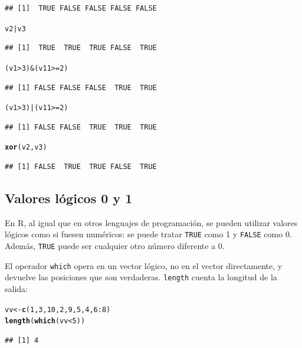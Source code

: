 \documentclass{config/apuntes}\usepackage[]{graphicx}\usepackage[]{xcolor}
\makeatletter
\newcommand{\hlnum}[1]{\textcolor[rgb]{0.686,0.059,0.569}{#1}}%
\newcommand{\hlopt}[1]{\textcolor[rgb]{0,0,0}{#1}}%
\newcommand{\hldef}[1]{\textcolor[rgb]{0.345,0.345,0.345}{#1}}%
\newcommand{\hlkwb}[1]{\textcolor[rgb]{0.69,0.353,0.396}{#1}}%
\newcommand{\hlkwd}[1]{\textcolor[rgb]{0.737,0.353,0.396}{\textbf{#1}}}%
\newenvironment{kframe}{%
 \def\at@end@of@kframe{}%
 \ifinner\ifhmode%
  \def\at@end@of@kframe{\end{minipage}}%
  \begin{minipage}{\columnwidth}%
 \fi\fi%
 \def\FrameCommand##1{\hskip\@totalleftmargin \hskip-\fboxsep
 \colorbox{shadecolor}{##1}\hskip-\fboxsep
     \hskip-\linewidth \hskip-\@totalleftmargin \hskip\columnwidth}%
 \MakeFramed {\advance\hsize-\width
   \@totalleftmargin\z@ \linewidth\hsize
   \@setminipage}}%
 {\par\unskip\endMakeFramed%
 \at@end@of@kframe}
\newenvironment{knitrout}{}{} %
\newcommand{\code}[1]{\texttt{#1}}
\makeatother
\begin{document}
\begin{knitrout}
\begin{kframe}
\begin{alltt}
\end{alltt}
\begin{verbatim}
## [1]  TRUE FALSE FALSE FALSE FALSE
\end{verbatim}
\begin{alltt}
\hldef{v2} \hlopt{|} \hldef{v3}
\end{alltt}
\begin{verbatim}
## [1]  TRUE  TRUE  TRUE FALSE  TRUE
\end{verbatim}
\begin{alltt}
\hldef{(v1} \hlopt{>} \hlnum{3}\hldef{)} \hlopt{&} \hldef{(v11} \hlopt{>=} \hlnum{2}\hldef{)}
\end{alltt}
\begin{verbatim}
## [1] FALSE FALSE FALSE  TRUE  TRUE
\end{verbatim}
\begin{alltt}
\hldef{(v1} \hlopt{>} \hlnum{3}\hldef{)} \hlopt{|} \hldef{(v11} \hlopt{>=} \hlnum{2}\hldef{)}
\end{alltt}
\begin{verbatim}
## [1] FALSE FALSE  TRUE  TRUE  TRUE
\end{verbatim}
\begin{alltt}
\hlkwd{xor}\hldef{(v2, v3)}
\end{alltt}
\begin{verbatim}
## [1] FALSE  TRUE  TRUE FALSE  TRUE
\end{verbatim}
\end{kframe}
\end{knitrout}

\subsection{Valores lógicos 0 y 1}
En R, al igual que en otros lenguajes de programación, se pueden utilizar valores lógicos como si fuesen numéricos: se puede tratar \code{TRUE} como 1 y \code{FALSE} como 0. Además, \code{TRUE} puede ser cualquier otro número diferente a 0. 

El operador \code{which} opera en un vector lógico, no en el vector directamente, y devuelve las posiciones que son verdaderas. \code{length} cuenta la longitud de la salida:

\begin{knitrout}
\color{fgcolor}\begin{kframe}
\begin{alltt}
\hldef{vv} \hlkwb{<-} \hlkwd{c}\hldef{(}\hlnum{1}\hldef{,} \hlnum{3}\hldef{,} \hlnum{10}\hldef{,} \hlnum{2}\hldef{,} \hlnum{9}\hldef{,} \hlnum{5}\hldef{,} \hlnum{4}\hldef{,} \hlnum{6}\hlopt{:}\hlnum{8}\hldef{)}
\hlkwd{length}\hldef{(}\hlkwd{which}\hldef{(vv} \hlopt{<} \hlnum{5}\hldef{))}
\end{alltt}
\begin{verbatim}
## [1] 4
\end{verbatim}
\end{kframe}
\end{knitrout}
\end{document}
